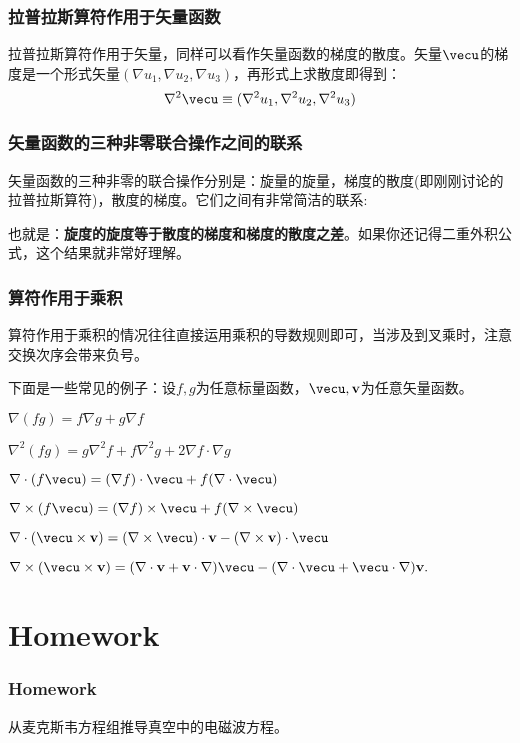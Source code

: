 \documentclass[CJK]{beamer}
\begin{document}
\begin{frame}
  \frametitle{拉普拉斯算符作用于矢量函数}
  拉普拉斯算符作用于矢量，同样可以看作矢量函数的梯度的散度。矢量$\vecu$的梯度是一个形式矢量$(\nabla u_1, \nabla u_2, \nabla u_3)$，再形式上求散度即得到：
  $$\nabla^2\vecu \equiv (\nabla^2 u_1, \nabla^2 u_2, \nabla^2 u_3)$$
\end{frame}

\begin{frame}
  \frametitle{矢量函数的三种非零联合操作之间的联系}
  矢量函数的三种非零的联合操作分别是：旋量的旋量，梯度的散度(即刚刚讨论的拉普拉斯算符)，散度的梯度。它们之间有非常简洁的联系:

  \tbox{$$\nabla\times (\nabla \times \vecu) =  \nabla(\nabla\cdot \vecu) - \nabla^2\vecu$$}
  也就是：{\bf 旋度的旋度等于散度的梯度和梯度的散度之差}。如果你还记得二重外积公式，这个结果就非常好理解。
\end{frame}


\begin{frame}
  \frametitle{算符作用于乘积}
  算符作用于乘积的情况往往直接运用乘积的导数规则即可，当涉及到叉乘时，注意交换次序会带来负号。

  下面是一些常见的例子：设$f,g$为任意标量函数，$\vecu,\vecv$为任意矢量函数。

  \bitem
 \item{$\nabla (fg) = f\nabla g + g\nabla f$}
 \item{$ \nabla^2(fg) = g\nabla^2f + f\nabla^2g + 2\nabla f\cdot\nabla g$}
 \item{$\nabla\cdot(f\vecu) = (\nabla f) \cdot \vecu + f(\nabla \cdot \vecu) $}
 \item{$ \nabla\times (f\vecu) = (\nabla f)\times\vecu + f(\nabla \times \vecu) $}
 \item{$ \nabla\cdot(\vecu\times\vecv) = (\nabla\times\vecu)\cdot \vecv - (\nabla\times\vecv)\cdot \vecu $}
 \item{$ \nabla\times(\vecu\times\vecv) = (\nabla\cdot\vecv + \vecv\cdot \nabla)\vecu - (\nabla\cdot\vecu+\vecu\cdot \nabla)\vecv. $}   
   \eitem

\end{frame}


\section{Homework}

\begin{frame}
  \frametitle{Homework}
  
  \bitem
\item{从麦克斯韦方程组推导真空中的电磁波方程。}
  \eitem

  
\end{frame}
\end{document}

